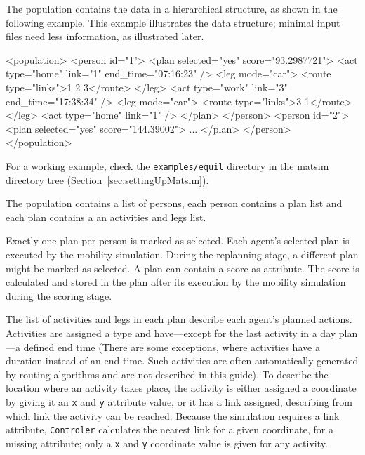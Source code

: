 The population contains the data in a hierarchical structure, as shown in the following example.  This example illustrates the data structure; minimal input files need less information, as illustrated later.
\begin{xml}
<population> 
   <person id="1"> 
      <plan selected="yes" score="93.2987721"> 
         <act type="home" link="1" end_time="07:16:23" /> 
         <leg mode="car"> 
            <route type="links">1 2 3</route> 
         </leg> 
         <act type="work" link="3" end_time="17:38:34" /> 
         <leg mode="car"> 
            <route type="links">3 1</route> 
         </leg> 
         <act type="home" link="1" /> 
      </plan> 
   </person> 
   <person id="2"> 
      <plan selected="yes" score="144.39002"> 
         ...
      </plan> 
   </person> 
</population>
\end{xml}
For a working example, check the \lstinline{examples/equil} directory in the \gls{matsim} directory tree (\cf Section~\ref{sec:settingUpMatsim}).

The population contains a list of persons, each person contains a plan list and each plan contains a an activities and legs list.

Exactly one \gls{plan} per person is marked as selected. Each agent's selected plan is executed by the mobility simulation. During the \gls{replanning} stage, a different plan might be marked as selected. A \gls{plan} can contain a score as attribute. The score is calculated and stored in the plan after its execution by the mobility simulation during the scoring stage.

The list of activities and legs in each plan describe each agent's planned actions. Activities are assigned  a type and have---except for the last activity in a day plan---a defined end time (There are some exceptions, where activities have a duration instead of an end time. Such activities are often automatically generated by routing algorithms and are not described in this guide). To describe the location where an activity takes place, the activity is either assigned a coordinate by giving it an \lstinline|x| and \lstinline|y| attribute value, or it has a link assigned, describing from which link the activity can be reached. Because the simulation requires a link attribute, \lstinline|Controler| calculates the nearest link for a given coordinate, for a missing attribute; only a \lstinline|x| and \lstinline|y| coordinate value is given for any activity.

